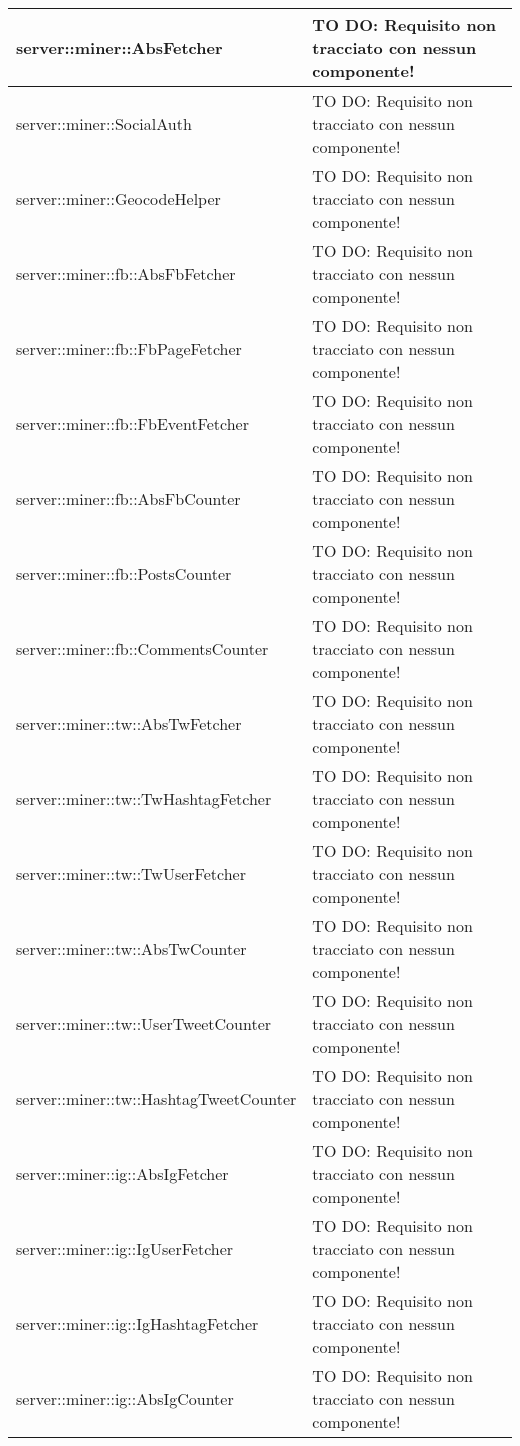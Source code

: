 \begin{center}
\begin{longtable}{| p{11cm} | p{2.5cm} |}
\hline
server::miner::AbsFetcher & TO DO: Requisito non tracciato con nessun componente! \\
\hline
server::miner::SocialAuth & TO DO: Requisito non tracciato con nessun componente! \\
\hline
server::miner::GeocodeHelper & TO DO: Requisito non tracciato con nessun componente! \\
\hline
server::miner::fb::AbsFbFetcher & TO DO: Requisito non tracciato con nessun componente! \\
\hline
server::miner::fb::FbPageFetcher & TO DO: Requisito non tracciato con nessun componente! \\
\hline
server::miner::fb::FbEventFetcher & TO DO: Requisito non tracciato con nessun componente! \\
\hline
server::miner::fb::AbsFbCounter & TO DO: Requisito non tracciato con nessun componente! \\
\hline
server::miner::fb::PostsCounter & TO DO: Requisito non tracciato con nessun componente! \\
\hline
server::miner::fb::CommentsCounter & TO DO: Requisito non tracciato con nessun componente! \\
\hline
server::miner::tw::AbsTwFetcher & TO DO: Requisito non tracciato con nessun componente! \\
\hline
server::miner::tw::TwHashtagFetcher & TO DO: Requisito non tracciato con nessun componente! \\
\hline
server::miner::tw::TwUserFetcher & TO DO: Requisito non tracciato con nessun componente! \\
\hline
server::miner::tw::AbsTwCounter & TO DO: Requisito non tracciato con nessun componente! \\
\hline
server::miner::tw::UserTweetCounter & TO DO: Requisito non tracciato con nessun componente! \\
\hline
server::miner::tw::HashtagTweetCounter & TO DO: Requisito non tracciato con nessun componente! \\
\hline
server::miner::ig::AbsIgFetcher & TO DO: Requisito non tracciato con nessun componente! \\
\hline
server::miner::ig::IgUserFetcher & TO DO: Requisito non tracciato con nessun componente! \\
\hline
server::miner::ig::IgHashtagFetcher & TO DO: Requisito non tracciato con nessun componente! \\
\hline
server::miner::ig::AbsIgCounter & TO DO: Requisito non tracciato con nessun componente! \\

\end{longtable}
\end{center}
